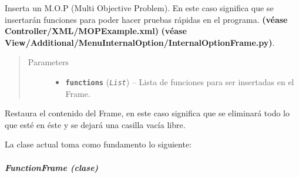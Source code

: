 \documentclass[class=report, crop=false]{standalone}
\begin{document}
\begin{fulllineitems}
\begin{fulllineitems}
Inserta un M.O.P (Multi Objective Problem).\break
En este caso significa que se insertarán funciones
para poder hacer pruebas rápidas en el programa.\break
\textbf{(véase Controller/XML/MOPExample.xml)}\break
\textbf{(véase View/Additional/MenuInternalOption/InternalOptionFrame.py)}.

\begin{quote}\begin{description}
\item[{Parameters}] \leavevmode\begin{itemize}
\item \textbf{\texttt{functions}} (\emph{\texttt{List}}) -- Lista de funciones para ser insertadas en el Frame.
\end{itemize}
\end{description}\end{quote}

\end{fulllineitems}

\begin{fulllineitems}

Restaura el contenido del Frame, en este caso significa 
que se eliminará todo lo que esté en éste y se dejará 
una casilla vacía libre.

\end{fulllineitems}

\end{fulllineitems}

La clase actual toma como fundamento lo siguiente:

\subparagraph{FunctionFrame (clase)}
\label{sec:a_3_2_3_1_1}
\end{document}

